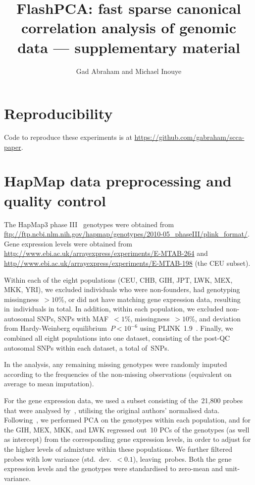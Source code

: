 \documentclass[a4paper,10pt]{scrartcl}
\author{Gad Abraham and Michael Inouye}
\title{FlashPCA: fast sparse canonical correlation analysis of genomic data
--- supplementary material}
\begin{document}
\maketitle

\section{Reproducibility}

Code to reproduce these experiments is at
\url{https://github.com/gabraham/scca-paper}.

\section{HapMap data preprocessing and quality control}

The HapMap3 phase III~\citep{hapmap2010} genotypes were obtained from
\url{ftp://ftp.ncbi.nlm.nih.gov/hapmap/genotypes/2010-05_phaseIII/plink_format/}.
Gene expression levels were obtained from
\url{http://www.ebi.ac.uk/arrayexpress/experiments/E-MTAB-264} and
\url{http//www.ebi.ac.uk/arrayexpress/experiments/E-MTAB-198} (the CEU subset).

Within each of the eight populations (CEU, CHB, GIH, JPT, LWK, MEX,
MKK, YRI), we excluded individuals who were non-founders, had genotyping
missingness~${>}10\%$, or did not have matching gene expression data, resulting
in~\nindiv individuals in total. In addition, within each population, we
excluded non-autosomal SNPs, SNPs with MAF~${<}1\%$, missingness~${>}10\%$,
and deviation from Hardy-Weinberg equilibrium~$P{<}10^{-6}$ using
PLINK~1.9~\citep{purcell2007,Chang2015}.  Finally, we combined all eight
populations into one dataset, consisting of the post-QC autosomal SNPs within
each dataset, a total of~\nsnps SNPs.

In the analysis, any remaining missing genotypes were randomly imputed
according to the frequencies of the non-missing observations (equivalent on
average to mean imputation).

For the gene expression data, we used a subset consisting of the~21,800 probes
that were analysed by~\citet{Stranger2012}, utilising the original authors'
normalised data. Following~\citet{Stranger2012}, we performed PCA on the
genotypes within each population, and for the GIH, MEX, MKK, and LWK regressed
out~10 PCs of the genotypes (as well as intercept) from the corresponding gene
expression levels, in order to adjust for the higher levels of admixture within
these populations.  We further filtered probes with low variance
(std.~dev.~${<}0.1$), leaving~\ngenes probes. Both the gene expression levels and
the genotypes were standardised to zero-mean and unit-variance.
\end{document}
